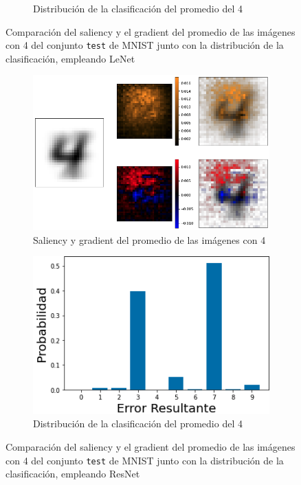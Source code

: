 \begin{figure}[h!]
\begin{subfigure}[b]{0.47\textwidth}
        \caption{Distribución de la clasificación del promedio del 4}
        \label{4_error}
    \end{subfigure}
    \caption{Comparación del saliency y el gradient del promedio de las imágenes con 4 del conjunto \texttt{test} de MNIST junto con la distribución de la clasificación, empleando LeNet}
    \label{4_SAL}
\end{figure}

\begin{figure}[h!]
    \centering
    \begin{subfigure}[b]{0.47\textwidth}
        \centering
        \includegraphics[width=\textwidth]{images/saliency/mnist/nonlinear/4_saliency_figures.png}
        \caption{Saliency y gradient del promedio de las imágenes con 4}
        \label{4_saliency_nonlin}
    \end{subfigure}
    \hfill
    \begin{subfigure}[b]{0.47\textwidth}
        \centering
        \includegraphics[width=\textwidth]{images/saliency/mnist/nonlinear/4_error.png}
        \caption{Distribución de la clasificación del promedio del 4}
        \label{4_error_nonlin}
    \end{subfigure}
    \caption{Comparación del saliency y el gradient del promedio de las imágenes con 4 del conjunto \texttt{test} de MNIST junto con la distribución de la clasificación, empleando ResNet}
    \label{4_SAL_NONLIN}
\end{figure}


